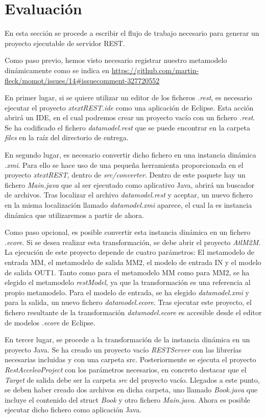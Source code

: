 \documentclass[runningheads]{llncs}
\begin{document}
\section{Evaluación}
\label{sc:eval}

En esta sección se procede a escribir el flujo de trabajo necesario para generar un proyecto ejecutable de servidor REST.

Como paso previo, hemos visto necesario registrar nuestro metamodelo dinámicamente como se indica en \url{https://github.com/martin-fleck/momot/issues/14\#issuecomment-327720552} 

En primer lugar, si se quiere utilizar un editor de los ficheros \textit{.rest}, es necesario ejecutar el proyecto \textit{xtextREST.ide} como una aplicación de Eclipse. Esta acción abrirá un IDE, en el cual podremos crear un proyecto vacío con un fichero \textit{.rest}. Se ha codificado el fichero \textit{datamodel.rest} que se puede encontrar en la carpeta \textit{files} en la raíz del directorio de entrega.

En segundo lugar, es necesario convertir dicho fichero en una instancia dinámica \textit{.xmi}. Para ello se hace uso de una pequeña herramienta proporcionada en el proyecto \textit{xtextREST}, dentro de \textit{src/converter}. Dentro de este paquete hay un fichero \textit{Main.java} que al ser ejecutado como aplicativo Java, abrirá un buscador de archivos. Tras localizar el archivo \textit{datamodel.rest} y aceptar, un nuevo fichero en la misma localización llamado \textit{datamodel.xmi} aparece, el cual la es instancia dinámica que utilizaremos a partir de ahora.

Como paso opcional, es posible convertir esta instancia dinámica en un fichero \textit{.ecore}. Si se desea realizar esta transformación, se debe abrir el proyecto \textit{AtlM2M}. La ejecución de este proyecto depende de cuatro parámetros: El metamodelo de entrada MM, el metamodelo de salida MM2, el modelo de entrada IN y el modelo de salida OUT1. Tanto como para el metamodelo MM como para MM2, se ha elegido el metamodelo \textit{restModel}, ya que la transformación es una referencia al propio metamodelo. Para el modelo de entrada, se ha elegido \textit{datamodel.xmi} y para la salida, un nuevo fichero \textit{datamodel.ecore}. Tras ejecutar este proyecto, el fichero resultante de la transformación \textit{datamodel.ecore} es accesible desde el editor de modelos \textit{.ecore} de Eclipse.

En tercer lugar, se procede a la transformación de la instancia dinámica en un proyecto Java. Se ha creado un proyecto vacío \textit{RESTServer} con las librerías necesarias incluidas y con una carpeta src. Posteriormente se ejecuta el proyecto \textit{RestAcceleoProject} con los parámetros necesarios, en concreto destacar que el \textit{Target} de salida debe ser la carpeta \textit{src} del proyecto vacío. Llegados a este punto, se deben haber creado dos archivos en dicha carpeta, uno llamado \textit{Book.java} que incluye el contenido del struct \textit{Book} y otro fichero \textit{Main.java}. Ahora es posible ejecutar dicho fichero como aplicación Java.
\end{document}
